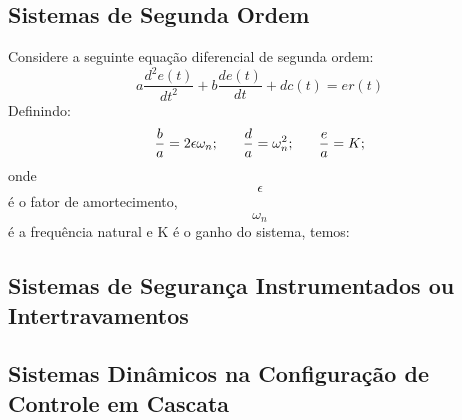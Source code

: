 \documentclass[a4paper,12pt]{article}
\begin{document}
\newpage

\subsection{Sistemas de Segunda Ordem}
\hspace{4ex}Considere a seguinte equação diferencial de segunda ordem:
    \[a\frac{d^2e(t)}{dt^2}+b\frac{de(t)}{dt}+dc(t)=er(t)\]
Definindo:
    \[\frac{b}{a}=2\epsilon\omega_n; \hspace{4ex} \frac{d}{a}=\omega^2_n; \hspace{4ex} \frac{e}{a}=K;\]
onde \[\epsilon\] é o fator de amortecimento, \[\omega_n\] é a frequência natural e K é o ganho do sistema, temos:


\subsection{Sistemas de Segurança Instrumentados ou Intertravamentos}\hspace{4ex}

\subsection{Sistemas Dinâmicos na Configuração de Controle em Cascata}\hspace{4ex}
\end{document}
